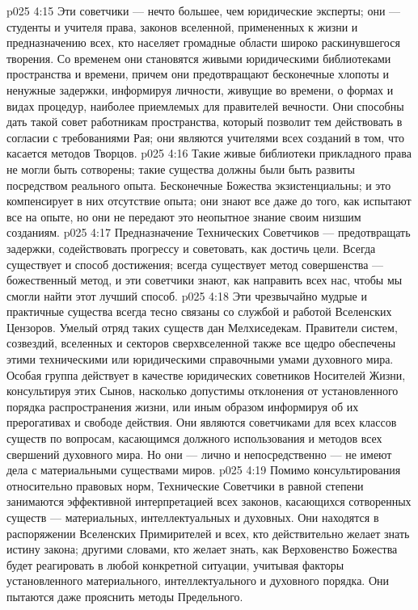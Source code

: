 \vs p025 4:15 Эти советчики --- нечто большее, чем юридические эксперты; они --- студенты и учителя  права, законов вселенной, примененных к жизни и предназначению всех, кто населяет громадные области широко раскинувшегося творения. Со временем они становятся живыми юридическими библиотеками пространства и времени, причем они предотвращают бесконечные хлопоты и ненужные задержки, информируя личности, живущие во времени, о формах и видах процедур, наиболее приемлемых для правителей вечности. Они способны дать такой совет работникам пространства, который позволит тем действовать в согласии с требованиями Рая; они являются учителями всех созданий в том, что касается методов Творцов.
\vs p025 4:16 Такие живые библиотеки прикладного права не могли быть сотворены; такие существа должны были быть развиты посредством реального опыта. Бесконечные Божества экзистенциальны; и это компенсирует в них отсутствие опыта; они знают все даже до того, как испытают все на опыте, но они не передают это неопытное знание своим низшим созданиям.
\vs p025 4:17 \pc Предназначение Технических Советчиков --- предотвращать задержки, содействовать прогрессу и советовать, как достичь цели. Всегда существует  и  способ достижения; всегда существует метод совершенства --- божественный метод, и эти советчики знают, как направить всех нас, чтобы мы смогли найти этот лучший способ.
\vs p025 4:18 Эти чрезвычайно мудрые и практичные существа всегда тесно связаны со службой и работой Вселенских Цензоров. Умелый отряд таких существ дан Мелхиседекам. Правители систем, созвездий, вселенных и секторов сверхвселенной также все щедро обеспечены этими техническими или юридическими справочными умами духовного мира. Особая группа действует в качестве юридических советников Носителей Жизни, консультируя этих Сынов, насколько допустимы отклонения от установленного порядка распространения жизни, или иным образом информируя об их прерогативах и свободе действия. Они являются советчиками для всех классов существ по вопросам, касающимся должного использования и методов всех свершений духовного мира. Но они --- лично и непосредственно --- не имеют дела с материальными существами миров.
\vs p025 4:19 Помимо консультирования относительно правовых норм, Технические Советчики в равной степени занимаются эффективной интерпретацией всех законов, касающихся сотворенных существ --- материальных, интеллектуальных и духовных. Они находятся в распоряжении Вселенских Примирителей и всех, кто действительно желает знать истину закона; другими словами, кто желает знать, как Верховенство Божества будет реагировать в любой конкретной ситуации, учитывая факторы установленного материального, интеллектуального и духовного порядка. Они пытаются даже прояснить методы Предельного.
